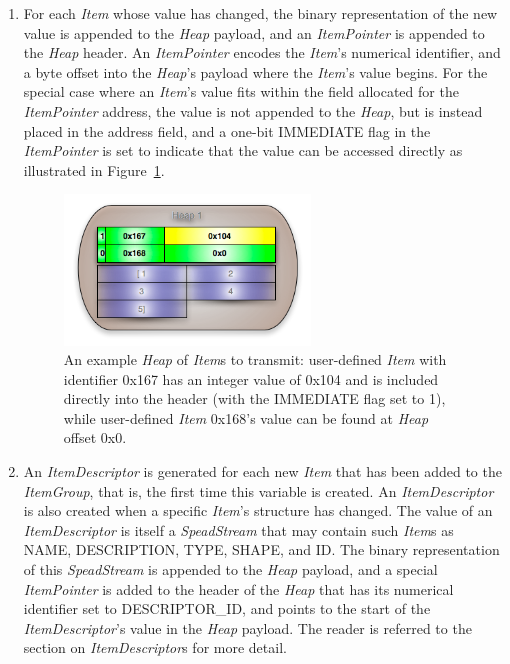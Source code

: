 \documentclass[11pt,english,twoside]{article}
\begin{document}
\begin{enumerate}

\item For each \emph{Item} whose value has changed, the binary representation of the new value is appended to the \emph{Heap} payload, and an
\emph{ItemPointer} is appended to the \emph{Heap} header.  An \emph{ItemPointer} encodes the \emph{Item}'s numerical identifier, and a byte
offset into the \emph{Heap}'s payload where the \emph{Item}'s value begins.  For the special case where an \emph{Item}'s value fits within the
field allocated for the \emph{ItemPointer} address, the value is not appended to the \emph{Heap}, but is instead placed in the address field,
and a one-bit IMMEDIATE flag in the \emph{ItemPointer} is set to indicate that the value can be accessed directly as illustrated in
Figure~\ref{fig:heap_construct}.
\begin{figure}[!htb]
\centering
\includegraphics[height=4cm]{images/spead_heap_construct}
\caption[Example \emph{Heap} construct]{\label{fig:heap_construct}\small An example \emph{Heap} of \emph{Item}s to transmit: user-defined
\emph{Item} with identifier 0x167 has an integer value of 0x104 and is included directly into the header (with the IMMEDIATE flag set to 1),
while user-defined \emph{Item} 0x168's value can be found at \emph{Heap} offset 0x0.}
\end{figure}


\item An \emph{ItemDescriptor} is generated for each new \emph{Item} that has been added to the \emph{ItemGroup}, that is, the first time
this variable is created. An \emph{ItemDescriptor} is also created when a specific \emph{Item}'s structure has changed.  The value of an
\emph{ItemDescriptor} is itself a \emph{SpeadStream} that may contain such \emph{Item}s as NAME, DESCRIPTION, TYPE, SHAPE, and ID.  The binary
representation of this \emph{SpeadStream} is appended to the \emph{Heap} payload, and a special \emph{ItemPointer} is added to the header of the
\emph{Heap} that has its numerical identifier set to DESCRIPTOR\_ID, and points to the start of the \emph{ItemDescriptor}'s value in the
\emph{Heap} payload. The reader is referred to the section on \emph{ItemDescriptor}s for more detail.


\end{enumerate}
\end{document}
